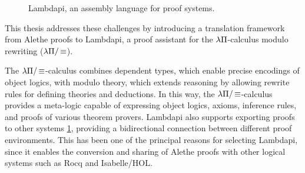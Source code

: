 \begin{figure}[t]
    \centering
    \caption{Lambdapi, an assembly language for proof systems.}
    \label{fig:interop-intro}
\end{figure}

This thesis addresses these challenges by introducing a translation framework from Alethe proofs to Lambdapi, a proof assistant for the $\lambda\Pi$-calculus modulo rewriting ($\lambda\Pi/\mathop{\equiv}$).

The $\lambda\Pi/\mathop{\equiv}$-calculus combines dependent types, which enable precise encodings of object logics, with modulo theory, which extends reasoning by allowing rewrite rules for defining theories and deductions.
In this way, the $\lambda\Pi/\mathop{\equiv}$-calculus provides a meta-logic capable of expressing object logics, axioms, inference rules, and proofs of various theorem provers.
Lambdapi also supports exporting proofs to other systems \cref{fig:interop-intro}, providing a bidirectional connection between different proof environments.
This has been one of the principal reasons for selecting Lambdapi, since it enables the conversion and sharing of Alethe proofs with other logical systems such as Rocq and Isabelle/HOL.

